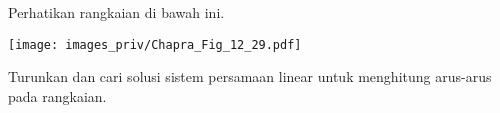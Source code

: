 \begin{soal}

Perhatikan rangkaian di bawah ini.

{\centering
\texttt{[image: images\_priv/Chapra\_Fig\_12\_29.pdf]}
\par}

Turunkan dan cari solusi sistem persamaan linear untuk menghitung arus-arus
pada rangkaian.

\end{soal}